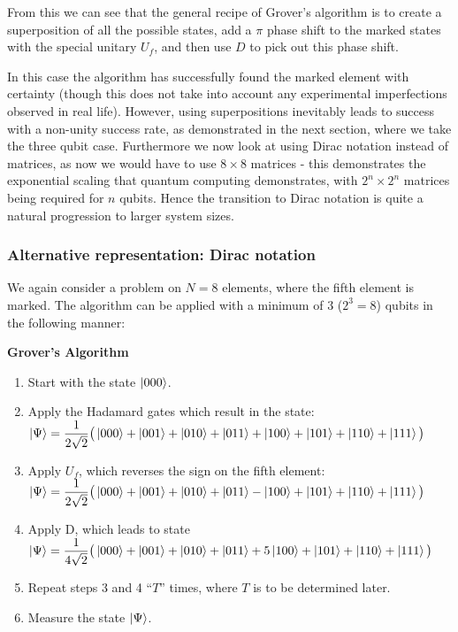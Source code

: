From this we can see that the general recipe of Grover's algorithm is to create a superposition of all the possible states, add a $\pi$ phase shift to the marked states with the special unitary $U_f$, and then use $D$ to pick out this phase shift.

In this case the algorithm has successfully found the marked element with certainty (though this does not take into account any experimental imperfections observed in real life). However, using superpositions inevitably leads to success with a non-unity success rate, as demonstrated in the next section, where we take the three qubit case. Furthermore we now look at using Dirac notation instead of matrices, as now we would have to use $8\times8$ matrices - this demonstrates the exponential scaling that quantum computing demonstrates, with $2^n\times2^n$ matrices being required for $n$ qubits. Hence the transition to Dirac notation is quite a natural progression to larger system sizes. 

\subsubsection{Alternative representation: Dirac notation}
We again consider a problem on $N=8$ elements, where the fifth element is marked. The algorithm can be applied with a minimum of $3$  ($2^{3}=8$) qubits in the following manner:

\begin{tcolorbox}[standard jigsaw,
    opacityback=0,  %
    boxrule=0.5pt,label={example1}]
    {\bf Grover's Algorithm}
    \tcbline
    \begin{enumerate}
    \item Start with the state $\left\vert{000}\right\rangle$.
    \item Apply the Hadamard gates which result in the state: $\left\vert{\Psi}\right\rangle=\dfrac{1}{2\sqrt{2}}\big(\left\vert{000}\right\rangle+\left\vert{001}\right\rangle+\left\vert{010}\right\rangle+\left\vert{011}\right\rangle+\left\vert{100}\right\rangle+\left\vert{101}\right\rangle+\left\vert{110}\right\rangle+\left\vert{111}\right\rangle\big)$
    \item Apply $U_{f}$, which reverses the sign on the fifth element: $\left\vert{\Psi}\right\rangle=\dfrac{1}{2\sqrt{2}}\big(\left\vert{000}\right\rangle+\left\vert{001}\right\rangle+\left\vert{010}\right\rangle+\left\vert{011}\right\rangle-\left\vert{100}\right\rangle+\left\vert{101}\right\rangle+\left\vert{110}\right\rangle+\left\vert{111}\right\rangle\big)$
    \item Apply D, which leads to state $\left\vert{\Psi}\right\rangle=\dfrac{1}{4\sqrt{2}}\big(\left\vert{000}\right\rangle+\left\vert{001}\right\rangle+\left\vert{010}\right\rangle+\left\vert{011}\right\rangle+5\left\vert{100}\right\rangle+\left\vert{101}\right\rangle+\left\vert{110}\right\rangle+\left\vert{111}\right\rangle\big)$
    \item Repeat steps 3 and 4 ``$T$'' times, where $T$ is to be determined later.
    \item Measure the state $\left\vert{\Psi}\right\rangle$.
    \end{enumerate}
\end{tcolorbox}



